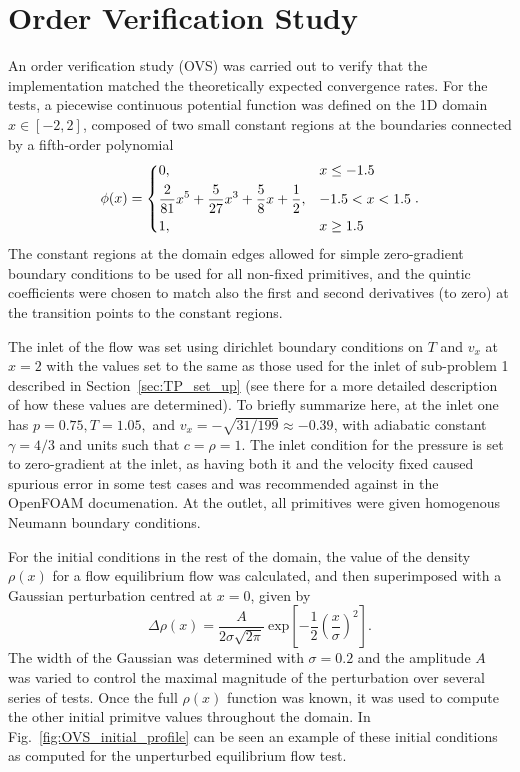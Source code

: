 \section{Order Verification Study}
\label{sec:OVS}

An order verification study (OVS) was carried out to verify that the implementation matched the theoretically expected convergence rates. For the tests, a piecewise continuous potential function was defined on the 1D domain $x\in[-2,2]$, composed of two small constant regions at the boundaries connected by a fifth-order polynomial
\begin{equation}
\phi(x)=
\begin{dcases} 
      0, & x\leq -1.5 \\
      \frac{2}{81}x^5+\frac{5}{27}x^3+\frac{5}{8}x+\frac{1}{2}, & -1.5<x<1.5 \\
      1, & x\geq 1.5
\end{dcases}.
\end{equation}
The constant regions at the domain edges allowed for simple zero-gradient boundary conditions to be used for all non-fixed primitives, and the quintic coefficients were chosen to match also the first and second derivatives (to zero) at the transition points to the constant regions.

The inlet of the flow was set using dirichlet boundary conditions on $T$ and $v_x$ at $x=2$ with the values set to the same as those used for the inlet of sub-problem 1 described in Section~\ref{sec:TP_set_up} (see there for a more detailed description of how these values are determined). To briefly summarize here, at the inlet one has $p=0.75, T=1.05,$ and $v_x=-\sqrt{31/199}\approx-0.39$, with adiabatic constant $\gamma=4/3$ and units such that $c=\rho=1$. The inlet condition for the pressure is set to zero-gradient at the inlet, as having both it and the velocity fixed caused spurious error in some test cases and was recommended against in the OpenFOAM documenation. At the outlet, all primitives were given homogenous Neumann boundary conditions.

For the initial conditions in the rest of the domain, the value of the density $\rho(x)$ for a flow equilibrium flow was calculated, and then superimposed with a Gaussian perturbation centred at $x=0$, given by
\begin{equation}
\Delta \rho(x)=\frac{A}{2\sigma \sqrt{2 \pi}}\ \textrm{exp}\left[-\frac{1}{2}\left(\frac{x}{\sigma}\right)^2\right].
\end{equation}
The width of the Gaussian was determined with $\sigma=0.2$ and the amplitude $A$ was varied to control the maximal magnitude of the perturbation over several series of tests. Once the full $\rho(x)$ function was known, it was used to compute the other initial primitve values throughout the domain. In Fig.~\ref{fig:OVS_initial_profile} can be seen an example of these initial conditions as computed for the unperturbed equilibrium flow test.

